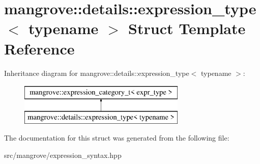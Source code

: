 \hypertarget{structmangrove_1_1details_1_1expression__type}{}\section{mangrove\+:\+:details\+:\+:expression\+\_\+type$<$ typename $>$ Struct Template Reference}
\label{structmangrove_1_1details_1_1expression__type}
Inheritance diagram for mangrove\+:\+:details\+:\+:expression\+\_\+type$<$ typename $>$\+:\begin{figure}[H]
\begin{center}
\leavevmode
\includegraphics[height=2.000000cm]{structmangrove_1_1details_1_1expression__type}
\end{center}
\end{figure}


The documentation for this struct was generated from the following file\+:\begin{DoxyCompactItemize}
\item 
src/mangrove/expression\+\_\+syntax.\+hpp\end{DoxyCompactItemize}
